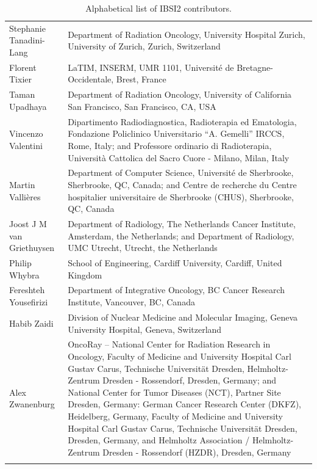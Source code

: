 \documentclass[fleqn,a4paper,oneside,openany]{book}
\begin{document}
\begin{longtable}{p{4cm}p{10cm}}
Stephanie Tanadini-Lang & Department of Radiation Oncology, University Hospital Zurich, University of Zurich, Zurich, Switzerland\\
Florent Tixier & LaTIM, INSERM, UMR 1101, Université de Bretagne-Occidentale, Brest, France\\
Taman Upadhaya & Department of Radiation Oncology, University of California San Francisco, San Francisco, CA, USA\\
Vincenzo Valentini & Dipartimento Radiodiagnostica, Radioterapia ed Ematologia, Fondazione Policlinico Universitario “A. Gemelli” IRCCS, Rome, Italy; and Professore ordinario di Radioterapia, Università Cattolica del Sacro Cuore - Milano, Milan, Italy\\
Martin Vallières & Department of Computer Science, Université de Sherbrooke, Sherbrooke, QC, Canada; and Centre de recherche du Centre hospitalier universitaire de Sherbrooke (CHUS), Sherbrooke, QC, Canada\\
Joost J M van Griethuysen & Department of Radiology, The Netherlands Cancer Institute, Amsterdam, the Netherlands; and Department of Radiology, UMC Utrecht, Utrecht, the Netherlands\\
Philip Whybra & School of Engineering, Cardiff University, Cardiff, United Kingdom\\
Fereshteh Yousefirizi & Department of Integrative Oncology, BC Cancer Research Institute, Vancouver, BC, Canada\\
Habib Zaidi & Division of Nuclear Medicine and Molecular Imaging, Geneva University Hospital, Geneva, Switzerland\\
Alex Zwanenburg & OncoRay – National Center for Radiation Research in Oncology, Faculty of Medicine and University Hospital Carl Gustav Carus, Technische Universität Dresden, Helmholtz-Zentrum Dresden - Rossendorf, Dresden, Germany; and National Center for Tumor Diseases (NCT), Partner Site Dresden, Germany: German Cancer Research Center (DKFZ), Heidelberg, Germany, Faculty of Medicine and University Hospital Carl Gustav Carus, Technische Universität Dresden, Dresden, Germany, and Helmholtz Association / Helmholtz-Zentrum Dresden - Rossendorf (HZDR), Dresden, Germany\\
 
\bottomrule
\caption{Alphabetical list of IBSI2 contributors.\label{participantList}}
\end{longtable}
\normalsize

\newpage
\setcounter{tocdepth}{1}
\tableofcontents
\end{document}
